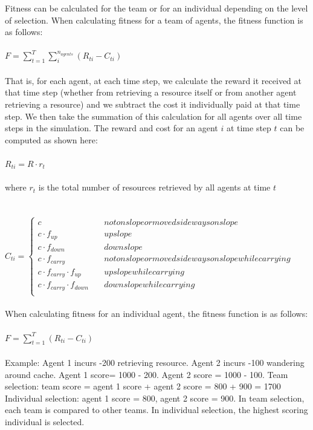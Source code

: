 \documentclass[12pt]{article}
\begin{document}
\begin{appendices}
Fitness can be calculated for the team or for an individual depending on the level of selection.
When calculating fitness for a team of agents, the fitness function is as follows:\\ 
\\
$F = \sum_{t=1}^{T} \sum_{i}^{n_{agents}} (R_{ti} - C_{ti}) $\\
\\
That is, for each agent, at each time step, we calculate the reward it received at that time step (whether from retrieving a resource itself or from another agent retrieving a resource) and we subtract the cost it individually paid at that time step. 
We then take the summation of this calculation for all agents over all time steps in the simulation.
The reward and cost for an agent $i$ at time step $t$ can be computed as shown here:\\
\\
$
R_{ti} = R \cdot r_{t}
$\\
\\
where $r_t$ is the total number of resources retrieved by all agents at time $t$
\\
\\
\\
$
C_{ti} = \left\{
        \begin{array}{ll}
            c & \quad not on slope or moved sideways on slope\\
            c \cdot f_{up} & \quad up slope\\
            c \cdot f_{down} & \quad down slope\\
            c \cdot f_{carry} & \quad not on slope or moved sideways on slope while carrying\\
            c \cdot f_{carry} \cdot f_{up} & \quad up slope while carrying \\
            c \cdot f_{carry} \cdot f_{down} & \quad down slope while carrying\\
        \end{array}
    \right.
$
\\
\\
When calculating fitness for an individual agent, the fitness function is as follows:\\
\\
$F = \sum_{t=1}^{T} (R_{ti} - C_{ti}) $
\\
\\
Example: Agent 1 incurs -200 retrieving resource. 
Agent 2 incurs -100 wandering around cache. 
Agent 1 score= 1000 - 200. 
Agent 2 score = 1000 - 100.
Team selection: team score = agent 1 score + agent 2 score = 800 + 900 = 1700
Individual selection: agent 1 score = 800, agent 2 score = 900. 
In team selection, each team is compared to other teams. 
In individual selection, the highest scoring individual is selected. 


\end{appendices}
\end{document}
